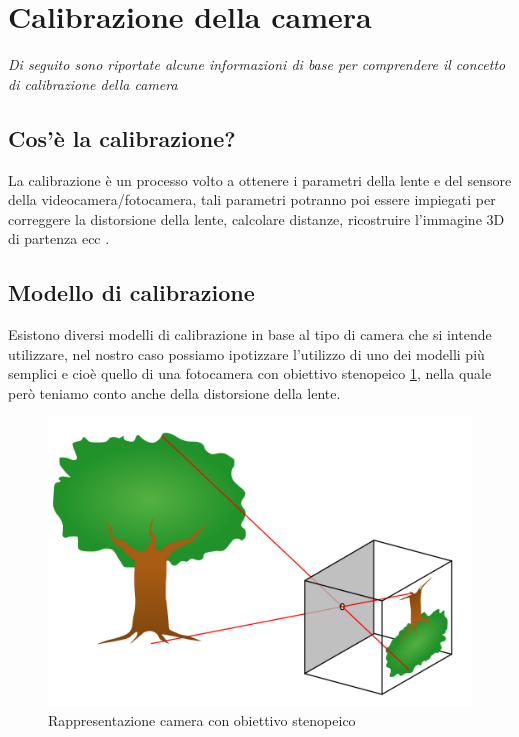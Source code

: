 \documentclass[12pt,a4paper,openright,twoside]{book}
\begin{document}
\section{Calibrazione della camera} \label{sec:calibrazione_della_camera}
\textit{Di seguito sono riportate alcune informazioni di base per comprendere il concetto di calibrazione della camera}	
\subsection{Cos'è la calibrazione?}
La calibrazione è un processo volto a ottenere i parametri della lente e del sensore della videocamera/fotocamera,
tali parametri potranno poi essere impiegati per correggere la distorsione della lente, calcolare distanze, ricostruire l'immagine 3D di partenza ecc \cite{cameraCalibrationMathWorks}.
\subsection{Modello di calibrazione}
Esistono diversi modelli di calibrazione in base al tipo di camera che si intende utilizzare, nel nostro caso possiamo ipotizzare l'utilizzo di uno dei modelli più semplici e cioè quello di una fotocamera con obiettivo stenopeico \ref{fig:pinhole_camera}, nella quale però teniamo conto anche della distorsione della lente. \cite{pinholeCamera} \cite{pinholeCameraModel} 
\begin{figure}[h!]
	\centering
	\includegraphics[width=0.5\linewidth]{./figures/Pinhole-camera.png}
	\caption{Rappresentazione camera con obiettivo stenopeico}
	\label{fig:pinhole_camera}
\end{figure}
\end{document}
